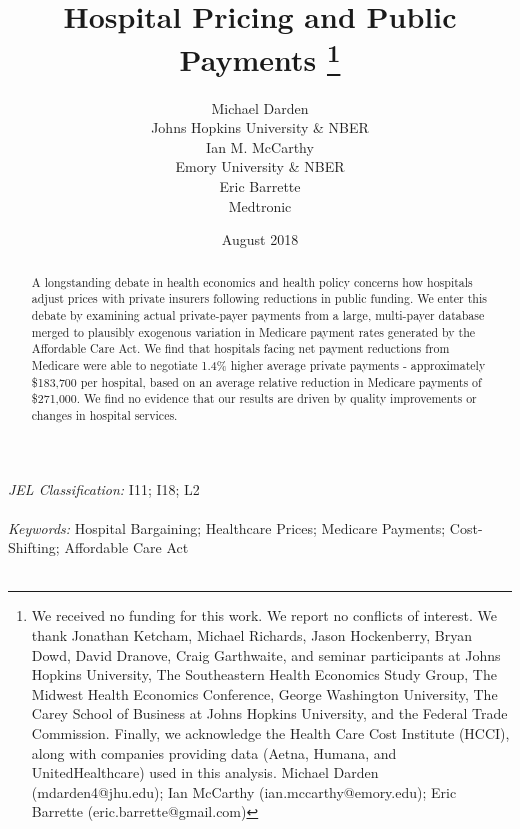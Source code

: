 \documentclass[12pt]{article}
\begin{document}
\title{Hospital Pricing and Public Payments \thanks{We received no funding for this work.  We report no conflicts of interest. We thank Jonathan Ketcham, Michael Richards, Jason Hockenberry, Bryan Dowd, David Dranove, Craig Garthwaite, and seminar participants at Johns Hopkins University, The Southeastern Health Economics Study Group, The Midwest Health Economics Conference, George Washington University, The Carey School of Business at Johns Hopkins University, and the Federal Trade Commission. Finally, we acknowledge the Health Care Cost Institute (HCCI), along with companies providing data (Aetna, Humana, and UnitedHealthcare) used in this analysis. Michael Darden (mdarden4@jhu.edu); Ian McCarthy (ian.mccarthy@emory.edu); Eric Barrette (eric.barrette@gmail.com)}}
\author{%
  Michael Darden \\[-0.5ex]
  Johns Hopkins University \& NBER \\
  Ian M. McCarthy \\[-0.5ex]
  Emory University \& NBER \\
  Eric Barrette \\[-0.5ex]
  Medtronic
}
\date{August 2018}

\maketitle

\begin{abstract}
A longstanding debate in health economics and health policy concerns how hospitals adjust prices with private insurers following reductions in public funding. We enter this debate by examining actual private-payer payments from a large, multi-payer database merged to plausibly exogenous variation in Medicare payment rates generated by the Affordable Care Act.  We find that hospitals facing net payment reductions from Medicare were able to negotiate 1.4\% higher average private payments - approximately \$183,700 per hospital, based on an average relative reduction in Medicare payments of \$271,000.  We find no evidence that our results are driven by quality improvements or changes in hospital services.
\end{abstract}
\noindent \textit{JEL Classification:} I11; I18; L2 \\\\
\noindent \textit{Keywords:} Hospital Bargaining; Healthcare Prices; Medicare Payments; Cost-Shifting; Affordable Care Act\\\\
\end{document}

